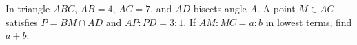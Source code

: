 In triangle $ABC$, $AB=4$, $AC=7$, and $AD$ bisects angle $A$. A point $M\in AC$ satisfies $P=BM\cap AD$ and $AP:PD=3:1$. If $AM:MC=a:b$ in lowest terms, find $a+b$.
